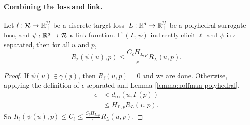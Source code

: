 \paragraph{Combining the loss and link.}
\begin{lemma*}
  Let $\ell: \mathcal{R} \to \mathbb{R}_+^{\mathcal{Y}}$ be a discrete target loss, $L: \mathbb{R}^d \to \mathbb{R}_+^{\mathcal{Y}}$ be a polyhedral surrogate loss, and $\psi: \mathbb{R}^d \to \mathcal{R}$ a link function.
  If $(L,\psi)$ indirectly elicit $\ell$ and $\psi$ is $\epsilon$-separated, then for all $u$ and $p$,
    \[ R_{\ell}(\psi(u),p) \leq \frac{C_{\ell} H_{L,p}}{\epsilon} R_L(u,p) . \]
\end{lemma*}
\begin{proof}
  If $\psi(u) \in \gamma(p)$, then $R_{\ell}(u,p) = 0$ and we are done.
  Otherwise, applying the definition of $\epsilon$-separated and Lemma \ref{lemma:hoffman-polyhedral},
  \begin{align*}
    \epsilon &<    d_{\infty}(u,\Gamma(p))  \\
             &\leq H_{L,p} R_L(u,p) .
  \end{align*}
  So $R_{\ell}(\psi(u),p) \leq C_{\ell} \leq \frac{C_{\ell} H_{L,p}}{\epsilon} R_L(u,p)$.
\end{proof}

